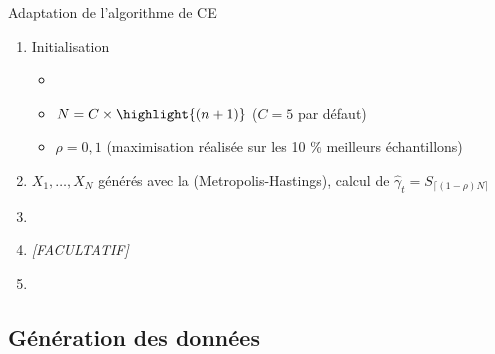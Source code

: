 \documentclass[10pt,xcolor=table,color={dvipsnames,usenames},ignorenonframetext,usepdftitle=false,french]{beamer}
\begin{document}
\begin{frame}{Adaptation de l'algorithme de CE}
\protect\hypertarget{adaptation-de-lalgorithme-de-ce}{}

\begin{enumerate}


\item Initialisation 

\begin{itemize}
\item 
{}
\item $N = C\times \highlight{(n+1)} $ ($C=5$ par défaut)
\item $\rho = 0,1$ (maximisation réalisée sur les 10 \% meilleurs échantillons)

\end{itemize}
 
\item $X_{1},\dots,X_{N}$ générés avec la  (Metropolis-Hastings), calcul de 
$\hat{\gamma}_{t}=S_{\lceil(1-\rho)N\rceil}$

\item {}

\item \emph{[FACULTATIF] }

\item {}

\end{enumerate}

\end{frame}

\hypertarget{guxe9nuxe9ration-des-donnuxe9es}{%
\subsection{Génération des
données}\label{guxe9nuxe9ration-des-donnuxe9es}}
\end{document}

